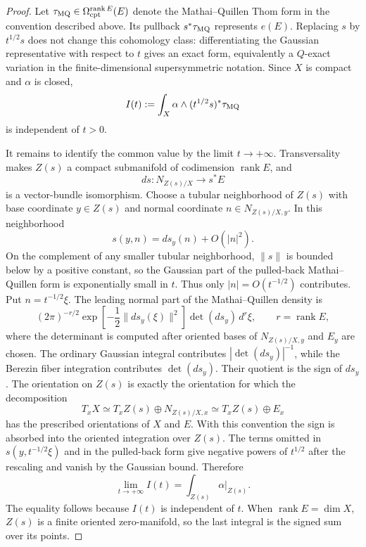 \begin{proof}
Let \(\tau_{\rm MQ}\in\Omega^{\operatorname{rank}E}_{\rm cpt}(E)\) denote the
Mathai--Quillen Thom form in the convention described above.  Its pullback
\(s^*\tau_{\rm MQ}\) represents \(e(E)\).  Replacing \(s\) by \(t^{1/2}s\)
does not change this cohomology class: differentiating the Gaussian
representative with respect to \(t\) gives an exact form, equivalently a
\(Q\)-exact variation in the finite-dimensional supersymmetric notation.
Since \(X\) is compact and \(\alpha\) is closed,
\[
  I(t):=\int_X\alpha\wedge (t^{1/2}s)^*\tau_{\rm MQ}
\]
is independent of \(t>0\).

It remains to identify the common value by the limit \(t\to+\infty\).
Transversality makes \(Z(s)\) a compact submanifold of codimension
\(\operatorname{rank}E\), and
\[
  ds:N_{Z(s)/X}\longrightarrow s^*E
\]
is a vector-bundle isomorphism.  Choose a tubular neighborhood of \(Z(s)\)
with base coordinate \(y\in Z(s)\) and normal coordinate \(n\in N_{Z(s)/X,y}\).
In this neighborhood
\[
  s(y,n)=ds_y(n)+O(|n|^2).
\]
On the complement of any smaller tubular neighborhood, \(\|s\|\) is bounded
below by a positive constant, so the Gaussian part of the pulled-back
Mathai--Quillen form is exponentially small in \(t\).  Thus only
\(|n|=O(t^{-1/2})\) contributes.  Put \(n=t^{-1/2}\xi\).  The leading normal
part of the Mathai--Quillen density is
\[
  (2\pi)^{-r/2}
  \exp\!\left[-\frac12\|ds_y(\xi)\|^2\right]
  \det(ds_y)\,d^r\xi,
  \qquad r=\operatorname{rank}E,
\]
where the determinant is computed after oriented bases of \(N_{Z(s)/X,y}\)
and \(E_y\) are chosen.  The ordinary Gaussian integral contributes
\(|\det(ds_y)|^{-1}\), while the Berezin fiber integration contributes
\(\det(ds_y)\).  Their quotient is the sign of \(ds_y\).  The orientation on
\(Z(s)\) is exactly the orientation for which the decomposition
\[
  T_xX\simeq T_xZ(s)\oplus N_{Z(s)/X,x}
  \simeq T_xZ(s)\oplus E_x
\]
has the prescribed orientations of \(X\) and \(E\).  With this convention the
sign is absorbed into the oriented integration over \(Z(s)\).  The
terms omitted in \(s(y,t^{-1/2}\xi)\) and in the pulled-back form give
negative powers of \(t^{1/2}\) after the rescaling and vanish by the Gaussian
bound.  Therefore
\[
  \lim_{t\to+\infty} I(t)=\int_{Z(s)}\alpha|_{Z(s)} .
\]
The equality follows because \(I(t)\) is independent of \(t\).  When
\(\operatorname{rank}E=\dim X\), \(Z(s)\) is a finite oriented zero-manifold,
so the last integral is the signed sum over its points.
\end{proof}

